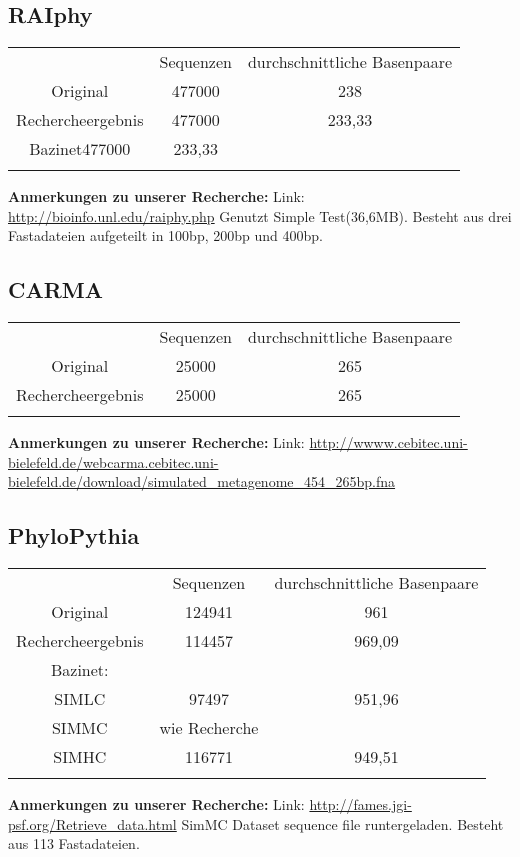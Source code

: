 \documentclass[a4paper, 11pt]{scrartcl}
\begin{document}
\begin{flushleft}
\subsection{RAIphy}
\begin{tabular}{ccc}
& Sequenzen & durchschnittliche Basenpaare \\
Original&477000&238\\
Rechercheergebnis&477000&233,33\\
Bazinet477000&233,33\\
&&\\
\end{tabular}
\linebreak
\color{red}
\textbf{Anmerkungen zu unserer Recherche:}\linebreak
Link: \url{http://bioinfo.unl.edu/raiphy.php}
\linebreak
Genutzt Simple Test(36,6MB).
\linebreak
Besteht aus drei Fastadateien aufgeteilt in 100bp, 200bp und 400bp.
\color{black}
\newpage

\subsection{CARMA}
\begin{tabular}{ccc}
& Sequenzen & durchschnittliche Basenpaare \\
Original&25000&265\\
Rechercheergebnis&25000&265\\
&&\\
\end{tabular}
\linebreak
\color{red}
\textbf{Anmerkungen zu unserer Recherche:}\linebreak
Link: \url{http://wwww.cebitec.uni-bielefeld.de/webcarma.cebitec.uni-bielefeld.de/download/simulated_metagenome_454_265bp.fna}
\color{black}

\subsection{PhyloPythia}
\begin{tabular}{ccc}
& Sequenzen & durchschnittliche Basenpaare \\
Original&124941&961\\
Rechercheergebnis&114457&969,09\\
Bazinet:&\\
SIMLC& 97497&951,96\\
SIMMC& wie Recherche\\
SIMHC&116771&949,51\\
&&\\
\end{tabular}
\linebreak
\color{red}
\textbf{Anmerkungen zu unserer Recherche:}\linebreak
Link: \url{http://fames.jgi-psf.org/Retrieve_data.html}
\linebreak
SimMC Dataset sequence file runtergeladen.
\linebreak
Besteht aus 113 Fastadateien.
\color{black}


\end{flushleft}
\end{document}
